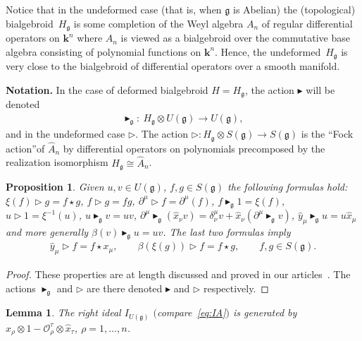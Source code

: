 \documentclass[10pt,a4paper]{amsart}
\def\genfd{\mathbf{k}}
\def\gg{\mathfrak{g}}
\def\hx{\hat{x}}
\def\hy{\hat{y}}
\newtheorem{Lemma}[Theorem]{Lemma}
\newtheorem{Proposition}[Theorem]{Proposition}
 { \theoremstyle{definition}
\newtheorem{Definition}[Theorem]{Definition}
\newtheorem{Example}[Theorem]{Example}
\newtheorem{Remark}[Theorem]{Remark} }
\numberwithin{equation}{section}
\begin{document}
Notice that in the undeformed case (that is, when $\gg$ is Abelian) the (topological) bialgebroid~$H_\gg$ is some completion of the Weyl algebra $A_n$ of regular differential operators on $\genfd^n$ where $A_n$ is viewed as a bialgebroid over the commutative base algebra consisting of polynomial functions on $\genfd^n$. Hence, the undeformed~$H_\gg$ is very close to the bialgebroid of differential operators over a smooth manifold.

{\bf Notation.} In the case of deformed bialgebroid $H = H_\gg$, the action $\blacktriangleright$ will be denoted
\begin{gather*}%
\blacktriangleright_\gg\colon \ H_\gg\otimes U(\gg)\to U(\gg),\end{gather*}
and in the undeformed case $\triangleright$. The action $\triangleright \colon H_\gg\otimes S(\gg)\to S(\gg)$ is the ``Fock action''of $\hat{A}_n$ by differential operators on polynomials precomposed by the realization isomorphism $H_\gg\cong\hat{A}_n$.

\begin{Proposition}
Given $u,v\in U(\gg)$, $f,g\in S(\gg)$ the following formulas hold: $\xi(f)\triangleright g = f\star g$, $f\triangleright g = f g$, $\partial^\mu\triangleright f = \partial^\mu(f)$, $f\blacktriangleright_\gg 1 = \xi(f)$, $u\triangleright 1 = \xi^{-1}(u)$, $u\blacktriangleright_\gg v = u v$, $\partial^\mu\blacktriangleright_\gg(\hx_\nu v)= \delta^\mu_\nu v + \hx_\nu (\partial^\mu\blacktriangleright_\gg v)$, $\hy_\mu\blacktriangleright_\gg u = u \hx_\mu$ and more generally $\beta(v)\blacktriangleright_\gg u = u v$. The last two formulas imply
\begin{gather}\label{eq:betastar}
\hy_\mu\triangleright f = f\star x_\mu,\qquad \beta(\xi(g))\triangleright f = f\star g,\qquad f,g\in S(\gg).
\end{gather}
\end{Proposition}
\begin{proof} These properties are at length discussed and proved in our articles~\cite{scopr,halg,heisd}. The actions $\blacktriangleright_\gg$ and $\triangleright$ are there denoted $\blacktriangleright$ and $\triangleright$ respectively.
\end{proof}

\begin{Lemma}\label{lem:IUg}
The right ideal $I_{U(\gg)}$ $($compare~\eqref{eq:IA}$)$ is generated by $\hat{x}_\rho\otimes 1 - \mathcal{O}^\tau_\rho\otimes\hat{x}_\tau$, $\rho = 1,\dots, n$.
\end{Lemma}
\end{document}
